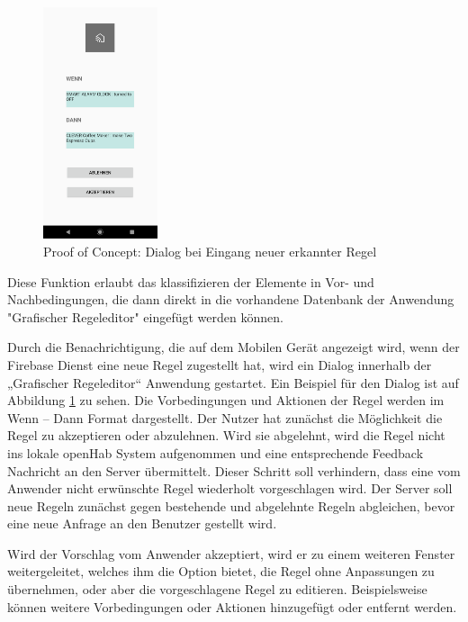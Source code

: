 \begin{figure}
  \begin{center}
    \includegraphics[width=0.3\textwidth]{figures/Appbildungen/newRuleDialog.png}
  \end{center}
  \label{fig:dialog}
  \caption{Proof of Concept: Dialog bei Eingang neuer erkannter Regel}
\end{figure}
\normalsize

Diese Funktion erlaubt das klassifizieren der Elemente in Vor- und Nachbedingungen, die dann direkt in die vorhandene Datenbank der Anwendung "Grafischer Regeleditor" eingefügt werden können.

Durch die Benachrichtigung, die auf dem Mobilen Gerät angezeigt wird, wenn der Firebase Dienst eine neue Regel zugestellt hat, wird ein Dialog innerhalb der „Grafischer Regeleditor“ Anwendung gestartet. Ein Beispiel für den Dialog ist auf Abbildung \ref{fig:dialog} zu sehen. Die Vorbedingungen und Aktionen der Regel werden im Wenn – Dann Format dargestellt. Der Nutzer hat zunächst die Möglichkeit die Regel zu akzeptieren oder abzulehnen. Wird sie abgelehnt, wird die Regel nicht ins lokale openHab System aufgenommen und eine entsprechende Feedback Nachricht an den Server übermittelt. Dieser Schritt soll verhindern, dass eine vom Anwender nicht erwünschte Regel wiederholt vorgeschlagen wird. Der Server soll neue Regeln zunächst gegen bestehende und abgelehnte Regeln abgleichen, bevor eine neue Anfrage an den Benutzer gestellt wird.

Wird der Vorschlag vom Anwender akzeptiert, wird er zu einem weiteren Fenster weitergeleitet, welches ihm die Option bietet, die Regel ohne Anpassungen zu übernehmen, oder aber die vorgeschlagene Regel zu editieren. Beispielsweise können weitere Vorbedingungen oder Aktionen hinzugefügt oder entfernt werden. 


